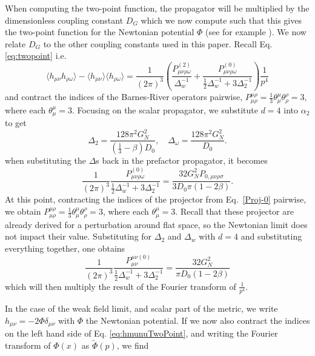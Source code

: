 \documentclass[aps,preprintnumbers,superscriptaddress,longbibliography]{revtex4-1}
\begin{document}
When computing the two-point function, the propagator will be multiplied by the dimensionless coupling constant $D_G$ which we now compute such that this gives the two-point function for the Newtonian potential $\Phi$ (see for example \cite{layton2023weak,UCLDMDNE}). We now relate $D_G$ to the other coupling constants used in this paper. Recall Eq. \eqref{eq:twopoint} i.e.
\begin{equation}
\langle h_{\mu\nu}h_{\rho\omega}\rangle-\langle h_{\mu\nu}\rangle\langle h_{\rho\omega}\rangle=
    \frac{1}{(2\pi)^3}\left(\frac{P^{(2)}_{\mu \nu \rho \omega}}{\Delta_w^{-1}}+\frac{P^{(0)}_{\mu \nu \rho \omega}}{\frac{1}{2}\Delta_w^{-1}+3\Delta_2^{-1}}\right)\frac{1}{p^4}
    \label{eq:hmunuTwoPoint}
\end{equation}
and contract the indices of the Barnes-River operators 
pairwise,  $P^{\mu\rho}_{\mu\rho}=\frac{1}{3}\theta^\mu_\mu \theta^\rho_\rho=3$, where each $\theta^\mu_\mu=3$. 
Focusing on the scalar propagator, we substitute $d=4$ into $\alpha_2$  to get 
\begin{equation}
     \Delta_2 = \frac{128\pi^2G_N^2}{\left(\frac{1}{3}-\beta\right)D_0}, \quad \Delta_{\omega} =\frac{128\pi^2G_N^2}{D_0}.
\end{equation}
when substituting the $\Delta$s back in the prefactor propagator, it becomes 
\begin{equation}
    \frac{1}{(2\pi)^3}\frac{P^{(0)}_{\mu \nu \rho \omega}}{\frac{1}{2}\Delta_w^{-1}+3\Delta_2^{-1}} = \frac{32 G^2_N P_{0,\mu\nu\rho\sigma}}{3 D_0  \pi (1 - 2 \beta)}.
\end{equation}
At this point, contracting the indices of the projector from Eq.~\eqref{Proj-0} pairwise, we obtain $P^{\mu\rho}_{\mu\rho}=\frac{1}{3}\theta^\mu_\mu \theta^\rho_\rho=3$, where each $\theta^\mu_\mu=3$. Recall that these projector are already derived for a perturbation around flat space, so the Newtonian limit does not impact their value. Substituting for $\Delta_2$ and 
$\Delta_w$ with $d=4$ and
substituting everything together, one obtains
\begin{equation}
\frac{1}{(2\pi)^3}\frac{P^{\mu \nu (0)}_{\mu \nu}}{\frac{1}{2}\Delta_w^{-1}+3\Delta_2^{-1}} = \frac{32 G^2_N }{\pi D_0(1-2\beta)}
\end{equation}
which will then multiply the result of the Fourier transform of $\frac{1}{p^4}$. 

In the case of the weak field limit, and scalar part of the metric, we write $h_{\mu\nu}=-2\Phi\delta_{\mu\nu}$ with $\Phi$ the Newtonian potential. If we now also contract the indices on the left hand side of Eq. \eqref{eq:hmunuTwoPoint}, and writing the Fourier transform of $\Phi(x)$ as $\tilde{\Phi}(p)$, we find
\end{document}
